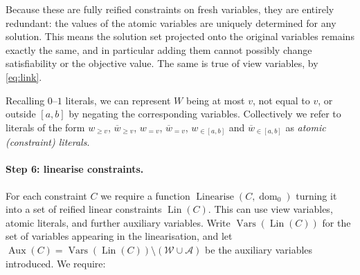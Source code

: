 \documentclass[11pt,a4paper]{article}
\theoremstyle{plain}
\theoremstyle{definition}
\theoremstyle{remark}
\newcommand{\fname}[1]{\ensuremath{\operatorname{#1}}}
\newcommand{\Lin}{\fname{Lin}}
\newcommand{\Aux}{\fname{Aux}}
\newcommand{\Vars}{\fname{Vars}}
\newcommand{\dm}{\fname{dom}}
\newcommand{\Linearise}{\fname{Linearise}}
\newcommand{\atge}[2]{#1_{\geq #2}}
\newcommand{\ateq}[2]{#1_{= #2}}
\newcommand{\atin}[3]{#1_{\in[#2,#3]}}
\newcommand{\natge}[2]{\overline{#1}_{\geq #2}}
\newcommand{\nateq}[2]{\overline{#1}_{= #2}}
\newcommand{\natin}[3]{\overline{#1}_{\in[#2,#3]}}
\begin{document}
Because these are fully reified constraints on fresh variables, they are
entirely redundant: the values of the atomic variables are uniquely determined
for any solution.  This means the solution set projected onto the original
variables remains exactly the same, and in particular adding them cannot
possibly change satisfiability or the objective value.  The same is true of
view variables, by \cref{eq:link}.

Recalling $0$--$1$ literals, we can represent $W$ being at most $v$, not equal
to $v$, or outside $[a,b]$ by negating the corresponding variables.
Collectively we refer to literals of the form $\atge{w}{v}$,
$\natge{w}{v}$, $\ateq{w}{v}$, $\nateq{w}{v}$,
$\atin{w}{a}{b}$ and $\natin{w}{a}{b}$ as \emph{atomic (constraint)
literals}.

\paragraph{Step 6: linearise constraints.}
For each constraint $C$ we require a function $\Linearise(C,\dm_0)$ turning it
into a set of reified linear constraints $\Lin(C)$.  This can use
view variables, atomic literals, and further auxiliary variables.
Write $\Vars(\Lin(C))$ for the set of variables appearing in the
linearisation, and let $\Aux(C) = \Vars(\Lin(C))\setminus(\mathcal W\cup
\mathcal A)$ be the auxiliary variables introduced.  We require:
\end{document}
